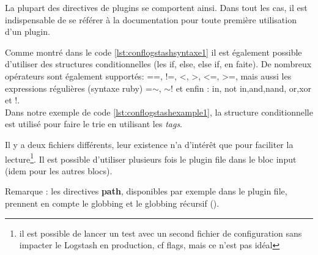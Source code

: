 La plupart des directives de plugins se comportent ainsi. Dans tout les cas, il
est indispensable de se référer à la documentation pour toute première utilisation d'un
plugin.


Comme montré dans le code \ref{lst:conflogstashsyntaxe1} il est également possible 
d'utiliser des structures conditionnelles (les if, else, else if, en faite).
De nombreux opérateurs sont également supportés: ==, !=, <, >, <=, >=, mais aussi
les expressions régulières (syntaxe ruby) =$\sim$, $\sim$! et enfin : in, not in,and,nand,
or,xor et !.\\[4mm]
Dans notre exemple de code \ref{lst:conflogstashexample1}, la structure conditionnelle
est utilisé pour faire le trie en utilisant les \emph{tags}.



Il y a deux fichiers différents, leur existence n'a d'intérêt que pour faciliter la
lecture\footnote{il est possible de lancer un test avec un second fichier de configuration
sans impacter le Logstash en production, cf flags, mais ce n'est pas idéal}. Il est
possible d'utiliser plusieurs fois le plugin file dans le bloc input (idem pour les 
autres blocs).

Remarque : les directives \textbf{path}, disponibles par exemple dans
le plugin file, prennent en compte le globbing et le globbing récursif 
().


